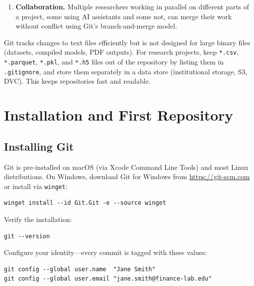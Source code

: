 \begin{context}
\begin{enumerate}
  \item \textbf{Collaboration.}  Multiple researchers working in parallel on
        different parts of a project, some using AI assistants and some not,
        can merge their work without conflict using Git's branch-and-merge
        model.
\end{enumerate}

\begin{remark}
\label{rem:git-not-backup}
Git tracks changes to text files efficiently but is not designed for large
binary files (datasets, compiled models, PDF outputs).  For research projects,
keep \texttt{*.csv}, \texttt{*.parquet}, \texttt{*.pkl}, and \texttt{*.h5}
files out of the repository by listing them in \texttt{.gitignore}, and store
them separately in a data store (institutional storage, S3, DVC).  This keeps
repositories fast and readable.
\end{remark}
\end{context}

\section{Installation and First Repository}
\label{app:git:install}

\subsection{Installing Git}
\label{app:git:install-git}

Git is pre-installed on macOS (via Xcode Command Line Tools) and most Linux
distributions.  On Windows, download Git for Windows from
\url{https://git-scm.com} or install via \texttt{winget}:

\begin{verbatim}
winget install --id Git.Git -e --source winget
\end{verbatim}

Verify the installation:

\begin{verbatim}
git --version
\end{verbatim}

Configure your identity---every commit is tagged with these values:

\begin{verbatim}
git config --global user.name  "Jane Smith"
git config --global user.email "jane.smith@finance-lab.edu"
\end{verbatim}

